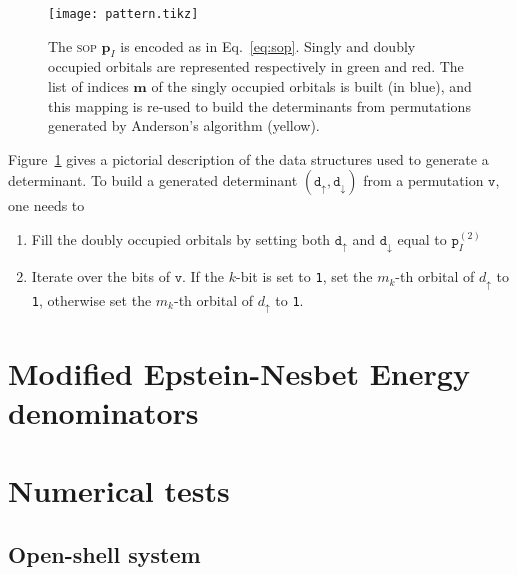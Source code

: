 \documentclass[aip,jcp,reprint,showkeys]{revtex4-1}
\newcommand{\tv}{\mathtt{v}}
\newcommand{\md}{\mathtt{d}}
\newcommand{\mpp}{\mathtt{p}}
\newcommand{\mpv}{\mathbf{p}}
\newcommand{\up}{\uparrow}
\newcommand{\dn}{\downarrow}
\newcommand{\one}{{\texttt{1}}}
\newcommand{\sop}{\textsc{sop}}
\begin{document}
\begin{figure}[t]
\texttt{[image: pattern.tikz]} 
\caption{The {\sop} $\mpv_I$ is encoded as in Eq.~\eqref{eq:sop}. Singly and doubly
occupied orbitals are represented respectively in green and red.
The list of indices $\mathbf{m}$ of the singly occupied orbitals is built (in blue), and this
mapping is re-used to build the determinants from permutations generated by Anderson's algorithm (yellow).}
\label{fig:mapping}
\end{figure}

Figure~\ref{fig:mapping} gives a pictorial description of the data structures used to generate a determinant.
To build a generated determinant $(\md_\up,\md_\dn)$ from a permutation $\tv$, one needs to
\begin{enumerate}
    \item Fill the doubly occupied orbitals by setting both $\md_\up$ and $\md_\dn$
          equal to $\mpp_I^{(2)}$
    \item Iterate over the bits of $\tv$. If the $k$-bit is set to \one{}, set the $m_k$-th orbital of $d_\up$ to \one, otherwise set the $m_k$-th orbital of $d_\up$ to \one.
\end{enumerate}



\section{Modified Epstein-Nesbet Energy denominators}




\section{Numerical tests}


\subsection{Open-shell system}
\end{document}
